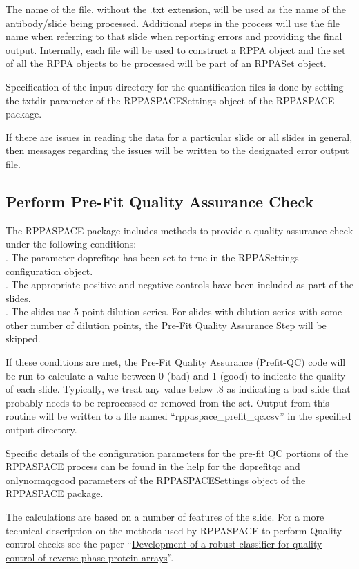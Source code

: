 \documentclass[
]{article}
\begin{document}
The name of the file, without the .txt extension, will be used as the
name of the antibody/slide being processed. Additional steps in the
process will use the file name when referring to that slide when
reporting errors and providing the final output. Internally, each file
will be used to construct a RPPA object and the set of all the RPPA
objects to be processed will be part of an RPPASet object.

Specification of the input directory for the quantification files is
done by setting the txtdir parameter of the RPPASPACESettings object of
the RPPASPACE package.

If there are issues in reading the data for a particular slide or all
slides in general, then messages regarding the issues will be written to
the designated error output file.

\hypertarget{process_2}{%
\subsection{Perform Pre-Fit Quality Assurance Check}\label{process_2}}

The RPPASPACE package includes methods to provide a quality assurance
check under the following conditions:\\
. The parameter doprefitqc has been set to true in the RPPASettings
configuration object.\\
. The appropriate positive and negative controls have been included as
part of the slides.\\
. The slides use 5 point dilution series. For slides with dilution
series with some other number of dilution points, the Pre-Fit Quality
Assurance Step will be skipped.

If these conditions are met, the Pre-Fit Quality Assurance (Prefit-QC)
code will be run to calculate a value between 0 (bad) and 1 (good) to
indicate the quality of each slide. Typically, we treat any value below
.8 as indicating a bad slide that probably needs to be reprocessed or
removed from the set. Output from this routine will be written to a file
named ``rppaspace\_prefit\_qc.csv'' in the specified output directory.

Specific details of the configuration parameters for the pre-fit QC
portions of the RPPASPACE process can be found in the help for the
doprefitqc and onlynormqcgood parameters of the RPPASPACESettings object
of the RPPASPACE package.

The calculations are based on a number of features of the slide. For a
more technical description on the methods used by RPPASPACE to perform
Quality control checks see the paper
``\href{https://www.ncbi.nlm.nih.gov/pmc/articles/PMC4375399/}{Development
of a robust classifier for quality control of reverse-phase protein
arrays}''.
\end{document}
